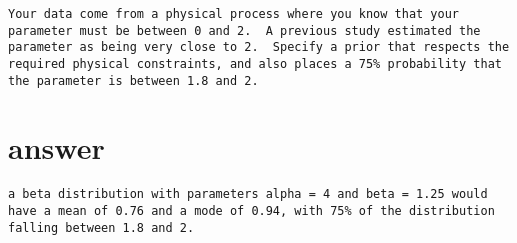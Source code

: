 \documentclass[
]{article}
\begin{document}
\begin{verbatim}
Your data come from a physical process where you know that your parameter must be between 0 and 2.  A previous study estimated the parameter as being very close to 2.  Specify a prior that respects the required physical constraints, and also places a 75% probability that the parameter is between 1.8 and 2. 
\end{verbatim}

\hypertarget{answer-1}{%
\section{answer}\label{answer-1}}

\begin{verbatim}
a beta distribution with parameters alpha = 4 and beta = 1.25 would have a mean of 0.76 and a mode of 0.94, with 75% of the distribution falling between 1.8 and 2.
\end{verbatim}
\end{document}
